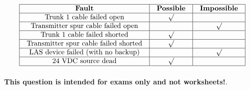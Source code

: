 






$$\vbox{\offinterlineskip
\halign{\strut
\vrule \quad\hfil # \ \hfil & 
\vrule \quad\hfil # \ \hfil & 
\vrule \quad\hfil # \ \hfil \vrule \cr
\noalign{\hrule}
%
{\bf Fault} & {\bf Possible} & {\bf Impossible} \cr
%
\noalign{\hrule}
%
Trunk 1 cable failed open & $\surd$ &  \cr
%
%
%
\noalign{\hrule}
%
Transmitter spur cable failed open &  & $\surd$ \cr
%
%
%
\noalign{\hrule}
%
Trunk 1 cable failed shorted & $\surd$ &  \cr
%
%
%
%
%
%
%
\noalign{\hrule}
%
Transmitter spur cable failed shorted & $\surd$ &  \cr
%
\noalign{\hrule}
%
LAS device failed (with no backup) &  & $\surd$ \cr
%
\noalign{\hrule}
%
24 VDC source dead & $\surd$ &  \cr
%
\noalign{\hrule}
} %
}$$ %







{\bf This question is intended for exams only and not worksheets!}.


